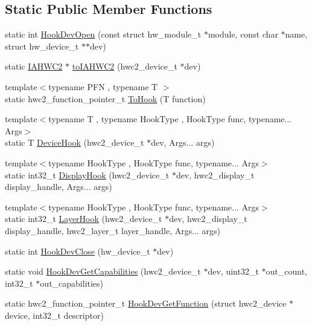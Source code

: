 \subsection*{Static Public Member Functions}
\begin{DoxyCompactItemize}
\item 
static int \mbox{\hyperlink{classandroid_1_1IAHWC2_a9a000bc25e85fbc053408f3885688e33}{Hook\+Dev\+Open}} (const struct hw\+\_\+module\+\_\+t $\ast$module, const char $\ast$name, struct hw\+\_\+device\+\_\+t $\ast$$\ast$dev)
\item 
static \mbox{\hyperlink{classandroid_1_1IAHWC2}{I\+A\+H\+W\+C2}} $\ast$ \mbox{\hyperlink{classandroid_1_1IAHWC2_a8a800faee2b34f1362effb240bedd921}{to\+I\+A\+H\+W\+C2}} (hwc2\+\_\+device\+\_\+t $\ast$dev)
\item 
{\footnotesize template$<$typename P\+FN , typename T $>$ }\\static hwc2\+\_\+function\+\_\+pointer\+\_\+t \mbox{\hyperlink{classandroid_1_1IAHWC2_a456dbb88757cb56b49e90d543984c1a9}{To\+Hook}} (T function)
\item 
{\footnotesize template$<$typename T , typename Hook\+Type , Hook\+Type func, typename... Args$>$ }\\static T \mbox{\hyperlink{classandroid_1_1IAHWC2_a994749ea99efb163360648e408a00e4e}{Device\+Hook}} (hwc2\+\_\+device\+\_\+t $\ast$dev, Args... args)
\item 
{\footnotesize template$<$typename Hook\+Type , Hook\+Type func, typename... Args$>$ }\\static int32\+\_\+t \mbox{\hyperlink{classandroid_1_1IAHWC2_ac200f209fed5da229b857a6be2a417d3}{Display\+Hook}} (hwc2\+\_\+device\+\_\+t $\ast$dev, hwc2\+\_\+display\+\_\+t display\+\_\+handle, Args... args)
\item 
{\footnotesize template$<$typename Hook\+Type , Hook\+Type func, typename... Args$>$ }\\static int32\+\_\+t \mbox{\hyperlink{classandroid_1_1IAHWC2_a8e25d258ac3a7c539c0fca11623773dd}{Layer\+Hook}} (hwc2\+\_\+device\+\_\+t $\ast$dev, hwc2\+\_\+display\+\_\+t display\+\_\+handle, hwc2\+\_\+layer\+\_\+t layer\+\_\+handle, Args... args)
\item 
static int \mbox{\hyperlink{classandroid_1_1IAHWC2_ac3298b89f4ebcb2cdd242699e1f75e89}{Hook\+Dev\+Close}} (hw\+\_\+device\+\_\+t $\ast$dev)
\item 
static void \mbox{\hyperlink{classandroid_1_1IAHWC2_af72ba2d7fbae030b39b208e34f458f5a}{Hook\+Dev\+Get\+Capabilities}} (hwc2\+\_\+device\+\_\+t $\ast$dev, uint32\+\_\+t $\ast$out\+\_\+count, int32\+\_\+t $\ast$out\+\_\+capabilities)
\item 
static hwc2\+\_\+function\+\_\+pointer\+\_\+t \mbox{\hyperlink{classandroid_1_1IAHWC2_a71d1f51b751729750a04a18f11d5fd64}{Hook\+Dev\+Get\+Function}} (struct hwc2\+\_\+device $\ast$device, int32\+\_\+t descriptor)
\end{DoxyCompactItemize}
